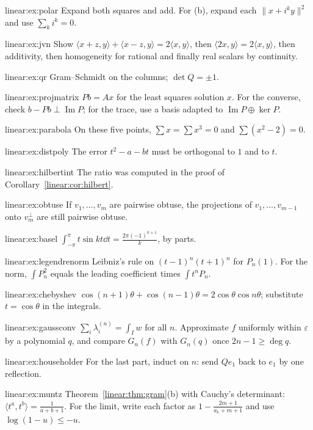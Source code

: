 \begin{hint}{linear:ex:polar}
Expand both squares and add. For (b), expand each $\|x+i^ky\|^2$ and use $\sum_ki^k=0$.
\end{hint}
\begin{hint}{linear:ex:jvn}
Show $\langle x+z,y\rangle+\langle x-z,y\rangle=2\langle x,y\rangle$, then $\langle2x,y\rangle=2\langle x,y\rangle$, then
additivity, then homogeneity for rational and finally real scalars by continuity.
\end{hint}
\begin{hint}{linear:ex:qr}
Gram--Schmidt on the columns; $\det Q=\pm1$.
\end{hint}
\begin{hint}{linear:ex:projmatrix}
$Pb=Ax$ for the least squares solution $x$. For the converse, check $b-Pb\perp\operatorname{Im}P$; for the trace, use a basis
adapted to $\operatorname{Im}P\oplus\ker P$.
\end{hint}
\begin{hint}{linear:ex:parabola}
On these five points, $\sum x=\sum x^3=0$ and $\sum(x^2-2)=0$.
\end{hint}
\begin{hint}{linear:ex:distpoly}
The error $t^2-a-bt$ must be orthogonal to $1$ and to $t$.
\end{hint}
\begin{hint}{linear:ex:hilbertint}
The ratio was computed in the proof of Corollary~\ref{linear:cor:hilbert}.
\end{hint}
\begin{hint}{linear:ex:obtuse}
If $v_1,\dots,v_m$ are pairwise obtuse, the projections of $v_1,\dots,v_{m-1}$ onto $v_m^\perp$ are still pairwise obtuse.
\end{hint}
\begin{hint}{linear:ex:basel}
$\int_{-\pi}^\pi t\sin kt\dd t=\frac{2\pi(-1)^{k+1}}k$, by parts.
\end{hint}
\begin{hint}{linear:ex:legendrenorm}
Leibniz's rule on $(t-1)^n(t+1)^n$ for $P_n(1)$. For the norm, $\int P_n^2$ equals the leading coefficient times
$\int t^nP_n$.
\end{hint}
\begin{hint}{linear:ex:chebyshev}
$\cos(n+1)\theta+\cos(n-1)\theta=2\cos\theta\cos n\theta$; substitute $t=\cos\theta$ in the integrals.
\end{hint}
\begin{hint}{linear:ex:gaussconv}
$\sum_i\lambda_i^{(n)}=\int_Iw$ for all $n$. Approximate $f$ uniformly within $\varepsilon$ by a polynomial $q$, and compare
$G_n(f)$ with $G_n(q)$ once $2n-1\ge\deg q$.
\end{hint}
\begin{hint}{linear:ex:householder}
For the last part, induct on $n$: send $Qe_1$ back to $e_1$ by one reflection.
\end{hint}
\begin{hint}{linear:ex:muntz}
Theorem~\ref{linear:thm:gram}(b) with Cauchy's determinant: $\langle t^a,t^b\rangle=\frac1{a+b+1}$. For the limit, write each factor
as $1-\frac{2m+1}{a_k+m+1}$ and use $\log(1-u)\le-u$.
\end{hint}

